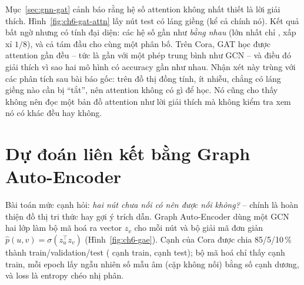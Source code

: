 Mục~\ref{sec:gnn-gat} cảnh báo rằng hệ số attention không nhất thiết là lời giải thích. Hình~\ref{fig:ch6-gat-attn} lấy
nút test  có  láng giềng (kể cả chính nó). Kết quả bất
ngờ nhưng có tính đại diện: các hệ số gần như \emph{bằng nhau} (lớn nhất chỉ , xấp xỉ
$1/8$), và cả tám đầu cho cùng một phân bố. Trên Cora, GAT học được attention gần đều -- tức là gần với một phép trung bình
như GCN -- và điều đó giải thích vì sao hai mô hình có accuracy gần như nhau. Nhận xét này trùng với các phân tích sau
bài báo gốc: trên đồ thị đồng tính, ít nhiễu, chẳng có láng giềng nào cần bị ``tắt'', nên attention không có gì để học.
Nó cũng cho thấy không nên đọc một bản đồ attention như lời giải thích mà không kiểm tra xem nó có khác đều hay không.


\section{Dự đoán liên kết bằng Graph Auto-Encoder}
\label{sec:gnn-link}

Bài toán mức cạnh hỏi: \emph{hai nút chưa nối có nên được nối không?} -- chính là hoàn thiện đồ thị tri thức hay gợi ý
trích dẫn. Graph Auto-Encoder \cite{ch6:kipf2016gae} dùng một GCN hai lớp làm bộ mã hoá ra vector $z_v$ cho mỗi nút và bộ
giải mã đơn giản $\hat p(u,v)=\sigma(z_u^{\top}z_v)$ (Hình~\ref{fig:ch6-gae}). Cạnh của Cora được chia 85/5/10\,\% thành
train/validation/test ( cạnh train,  cạnh test); bộ mã hoá chỉ thấy cạnh
train, mỗi epoch lấy ngẫu nhiên số mẫu âm (cặp không nối) bằng số cạnh dương, và loss là entropy chéo nhị phân.




